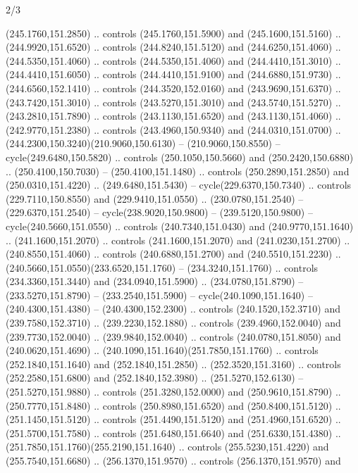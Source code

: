 \begin{flagdescription}{2/3}
\begin{scope}[xshift=0.5\flaglength,yshift=0.5\flagwidth,scale=\flagwidth/259.2]
\begin{scope}[y=0.8pt, x=0.8pt, yscale=-1,shift={(-243,-162)}]
      (245.1760,151.2850) .. controls (245.1760,151.5900) and (245.1600,151.5160) ..
      (244.9920,151.6520) .. controls (244.8240,151.5120) and (244.6250,151.4060) ..
      (244.5350,151.4060) .. controls (244.5350,151.4060) and (244.4410,151.3010) ..
      (244.4410,151.6050) .. controls (244.4410,151.9100) and (244.6880,151.9730) ..
      (244.6560,152.1410) .. controls (244.3520,152.0160) and (243.9690,151.6370) ..
      (243.7420,151.3010) .. controls (243.5270,151.3010) and (243.5740,151.5270) ..
      (243.2810,151.7890) .. controls (243.1130,151.6520) and (243.1130,151.4060) ..
      (242.9770,151.2380) .. controls (243.4960,150.9340) and (244.0310,151.0700) ..
      (244.2300,150.3240)(210.9060,150.6130) -- (210.9060,150.8550) --
      cycle(249.6480,150.5820) .. controls (250.1050,150.5660) and
      (250.2420,150.6880) .. (250.4100,150.7030) -- (250.4100,151.1480) .. controls
      (250.2890,151.2850) and (250.0310,151.4220) .. (249.6480,151.5430) --
      cycle(229.6370,150.7340) .. controls (229.7110,150.8550) and
      (229.9410,151.0550) .. (230.0780,151.2540) -- (229.6370,151.2540) --
      cycle(238.9020,150.9800) -- (239.5120,150.9800) -- cycle(240.5660,151.0550) ..
      controls (240.7340,151.0430) and (240.9770,151.1640) .. (241.1600,151.2070) ..
      controls (241.1600,151.2070) and (241.0230,151.2700) .. (240.8550,151.4060) ..
      controls (240.6880,151.2700) and (240.5510,151.2230) ..
      (240.5660,151.0550)(233.6520,151.1760) -- (234.3240,151.1760) .. controls
      (234.3360,151.3440) and (234.0940,151.5900) .. (234.0780,151.8790) --
      (233.5270,151.8790) -- (233.2540,151.5900) -- cycle(240.1090,151.1640) --
      (240.4300,151.4380) -- (240.4300,152.2300) .. controls (240.1520,152.3710) and
      (239.7580,152.3710) .. (239.2230,152.1880) .. controls (239.4960,152.0040) and
      (239.7730,152.0040) .. (239.9840,152.0040) .. controls (240.0780,151.8050) and
      (240.0620,151.4690) .. (240.1090,151.1640)(251.7850,151.1760) .. controls
      (252.1840,151.1640) and (252.1840,151.2850) .. (252.3520,151.3160) .. controls
      (252.2580,151.6800) and (252.1840,152.3980) .. (251.5270,152.6130) --
      (251.5270,151.9880) .. controls (251.3280,152.0000) and (250.9610,151.8790) ..
      (250.7770,151.8480) .. controls (250.8980,151.6520) and (250.8400,151.5120) ..
      (251.1450,151.5120) .. controls (251.4490,151.5120) and (251.4960,151.6520) ..
      (251.5700,151.7580) .. controls (251.6480,151.6640) and (251.6330,151.4380) ..
      (251.7850,151.1760)(255.2190,151.1640) .. controls (255.5230,151.4220) and
      (255.7540,151.6680) .. (256.1370,151.9570) .. controls (256.1370,151.9570) and

\end{scope}
\end{scope}
\end{flagdescription}
